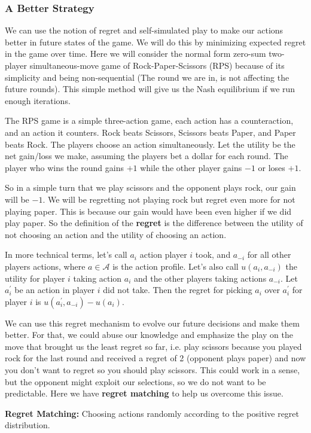 \subsubsection{A Better Strategy} %
\label{ssub:betterStrategy}
We can use the notion of regret and self-simulated play to make our actions better 
in future states of the game. We will do this by minimizing expected regret in the 
game over time. Here we will consider the normal form zero-sum two-player simultaneous-move 
game of Rock-Paper-Scissors (RPS) because of its simplicity and being non-sequential 
(The round we are in, is not affecting the future rounds). This simple method will give us 
the Nash equilibrium if we run enough iterations.

The RPS game is a simple three-action game, each action has a counteraction, and an action it counters.
Rock beats Scissors, Scissors beats Paper, and Paper beats Rock. The players choose an action
simultaneously. Let the utility be the net gain/loss we make, assuming the players bet a dollar for
each round. The player who wins the round gains $+1$ while the other player gains $-1$ or loses $+1$.  

So in a simple turn that we play scissors and the opponent plays rock, our gain will be $-1$. We will be 
regretting not playing rock but regret even more for not playing paper. This is because our gain would
have been even higher if we did play paper. So the definition of the \textbf{regret} is the difference
between the utility of not choosing an action and the utility of choosing an action.

In more technical terms, let's call $a_i$ action player $i$ took, and $a_{-i}$ for all other players
actions, where $a \in \mathcal{A}$ is the action profile. Let's also call $u(a_i, a_{-i})$ the utility 
for player $i$ taking action $a_i$ and the other players taking actions $a_{-i}$. Let $a^'_i$ be an 
action in  player $i$ did not take. Then the regret for picking $a_i$ over $a^'_i$ for player
$i$ is $u(a^'_i, a_{-i}) - u(a_i)$.

We can use this regret mechanism to evolve our future decisions and make them better. For that, we could
abuse our knowledge and emphasize the play on the move that brought us the least regret so far, i.e.
play scissors because you played rock for the last round and received a regret of 2 (opponent plays paper)
and now you don't want to regret so you should play scissors. This could work in a sense, but the opponent
might exploit our selections, so we do not want to be predictable. Here we have \textbf{regret matching}
to help us overcome this issue.

\textbf{Regret Matching:} Choosing actions randomly according to the positive regret distribution.


